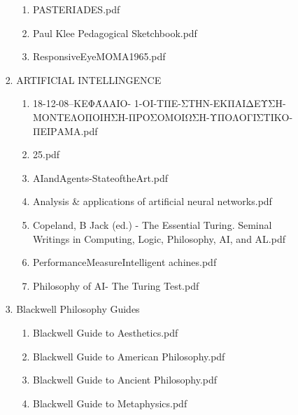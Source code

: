 \documentclass[11pt]{article}
\begin{document}
\begin{enumerate}
\begin{enumerate}
\begin{enumerate}
\begin{enumerate}
\begin{enumerate}
\item PASTERIADES.pdf
\label{sec-1-1-1-1-7-3-15-2}

\item Paul Klee Pedagogical Sketchbook.pdf
\label{sec-1-1-1-1-7-3-15-3}

\item ResponsiveEyeMOMA1965.pdf
\label{sec-1-1-1-1-7-3-15-4}
\end{enumerate}

\item ARTIFICIAL INTELLINGENCE
\label{sec-1-1-1-1-7-3-16}
\begin{enumerate}
\item 18-12-08--ΚΕΦΆΛΑΙΟ- 1-ΟΙ-ΤΠΕ-ΣΤΗΝ-ΕΚΠΑΙΔΕΥΣΗ-ΜΟΝΤΕΛΟΠΟΙΗΣΗ-ΠΡΟΣΟΜΟΙΩΣΗ-ΥΠΟΛΟΓΙΣΤΙΚΟ-ΠΕΙΡΑΜΑ.pdf
\label{sec-1-1-1-1-7-3-16-1}

\item 25.pdf
\label{sec-1-1-1-1-7-3-16-2}

\item AIandAgents-StateoftheArt.pdf
\label{sec-1-1-1-1-7-3-16-3}

\item Analysis \& applications of artificial neural networks.pdf
\label{sec-1-1-1-1-7-3-16-4}

\item Copeland, B Jack (ed.) - The Essential Turing. Seminal Writings in Computing, Logic, Philosophy, AI, and AL.pdf
\label{sec-1-1-1-1-7-3-16-5}

\item PerformanceMeasureIntelligent achines.pdf
\label{sec-1-1-1-1-7-3-16-6}

\item Philosophy of AI- The Turing Test.pdf
\label{sec-1-1-1-1-7-3-16-7}
\end{enumerate}

\item Blackwell Philosophy Guides
\label{sec-1-1-1-1-7-3-17}
\begin{enumerate}
\item Blackwell Guide to Aesthetics.pdf
\label{sec-1-1-1-1-7-3-17-1}

\item Blackwell Guide to American Philosophy.pdf
\label{sec-1-1-1-1-7-3-17-2}

\item Blackwell Guide to Ancient Philosophy.pdf
\label{sec-1-1-1-1-7-3-17-3}

\item Blackwell Guide to Metaphysics.pdf
\label{sec-1-1-1-1-7-3-17-4}


\end{enumerate}
\end{enumerate}
\end{enumerate}
\end{enumerate}
\end{enumerate}
\end{document}
